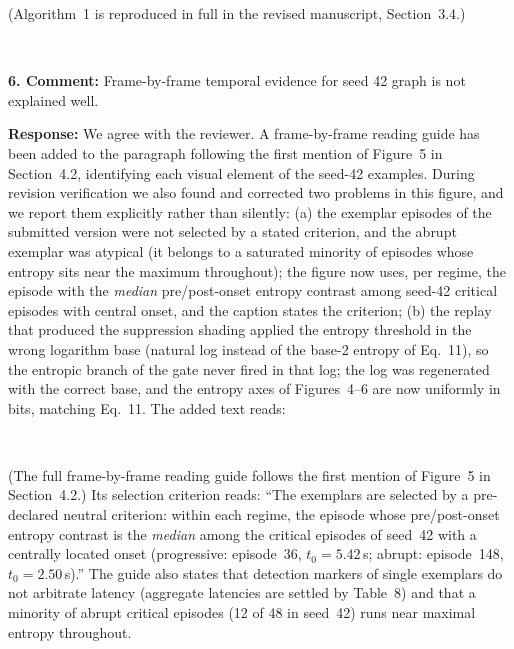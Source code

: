 \documentclass[1p,12pt,authoryear]{elsarticle}
\begin{document}
(Algorithm~1 is reproduced in full in the revised manuscript, Section~3.4.)



~

\noindent \textbf{6. Comment:} Frame-by-frame temporal evidence for seed 42 graph is not explained well.

\vspace{2mm}
\noindent \textbf{Response:} We agree with the reviewer. A frame-by-frame reading guide has been added to the paragraph following the first mention of Figure~5 in Section~4.2, identifying each visual element of the seed-42 examples. During revision verification we also found and corrected two problems in this figure, and we report them explicitly rather than silently: (a) the exemplar episodes of the submitted version were not selected by a stated criterion, and the abrupt exemplar was atypical (it belongs to a saturated minority of episodes whose entropy sits near the maximum throughout); the figure now uses, per regime, the episode with the \emph{median} pre/post-onset entropy contrast among seed-42 critical episodes with central onset, and the caption states the criterion; (b) the replay that produced the suppression shading applied the entropy threshold in the wrong logarithm base (natural log instead of the base-2 entropy of Eq.~11), so the entropic branch of the gate never fired in that log; the log was regenerated with the correct base, and the entropy axes of Figures~4--6 are now uniformly in bits, matching Eq.~11. The added text reads:

~

(The full frame-by-frame reading guide follows the first mention of Figure~5 in Section~4.2.) Its selection criterion reads: ``The exemplars are selected by a pre-declared neutral criterion: within each regime, the episode whose pre/post-onset entropy contrast is the \emph{median} among the critical episodes of seed~42 with a centrally located onset (progressive: episode~36, $t_0{=}5.42$\,s; abrupt: episode~148, $t_0{=}2.50$\,s).'' The guide also states that detection markers of single exemplars do not arbitrate latency (aggregate latencies are settled by Table~8) and that a minority of abrupt critical episodes (12 of 48 in seed~42) runs near maximal entropy throughout.

\newpage

\end{document}
